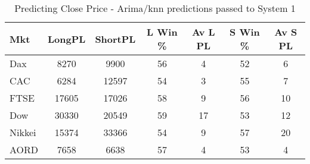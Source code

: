 \begin{table}[ht]
\centering
\caption[Predicting Close Price - Arima/knn predictions passed to System 1.]{Predicting Close Price - Arima/knn predictions passed to System 1} 
\label{tab:chp_ts:pred_close_arima_knn_sys1}
\begin{tabular}{lcccccc}
  \toprule Mkt & LongPL & ShortPL & L Win \% & Av L PL & S Win \% & Av S PL \\ 
  \midrule Dax & 8270 & 9900 & 56 & 4 & 52 & 6 \\ 
  CAC & 6284 & 12597 & 54 & 3 & 55 & 7 \\ 
  FTSE & 17605 & 17026 & 58 & 9 & 56 & 10 \\ 
  Dow & 30330 & 20549 & 59 & 17 & 53 & 12 \\ 
  Nikkei & 15374 & 33366 & 54 & 9 & 57 & 20 \\ 
  AORD & 7658 & 6638 & 57 & 4 & 53 & 4 \\ 
   \bottomrule \end{tabular}
\end{table}
